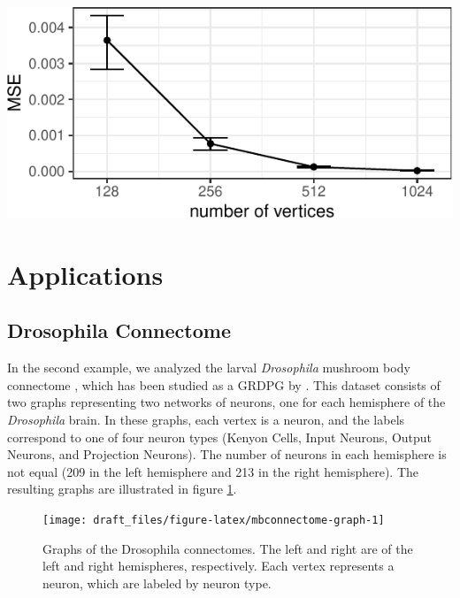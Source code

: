 \documentclass[12pt]{article}
\begin{document}
\begin{center}\includegraphics{draft_files/figure-latex/angle-reg-results-1} \end{center}

\section{Applications}\label{applications}

\subsection{Drosophila Connectome}\label{drosophila-connectome}

In the second example, we analyzed the larval \emph{Drosophila} mushroom
body connectome \citep{Eichler141762}, which has been studied as a GRDPG
by \citet{athreya2020estimation}. This dataset consists of two graphs
representing two networks of neurons, one for each hemisphere of the
\emph{Drosophila} brain. In these graphs, each vertex is a neuron, and
the labels correspond to one of four neuron types (Kenyon Cells, Input
Neurons, Output Neurons, and Projection Neurons). The number of neurons
in each hemisphere is not equal (209 in the left hemisphere and 213 in
the right hemisphere). The resulting graphs are illustrated in figure
\ref{fig:mbconnectome-graph}.

\begin{figure}[H]

{\centering \texttt{[image: draft\_files/figure-latex/mbconnectome-graph-1]} 

}

\caption{Graphs of the Drosophila connectomes. The left and right are of the left and right hemispheres, respectively. Each vertex represents a neuron, which are labeled by neuron type.}\label{fig:mbconnectome-graph}
\end{figure}
\end{document}
